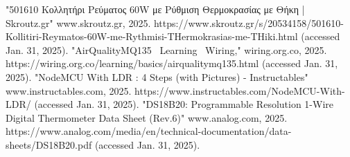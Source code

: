 \documentclass[conference]{IEEEtran}
\begin{document}
\begin{thebibliography}{00}
	 "501610 Κολλητήρι Ρεύματος 60W με Ρύθμιση Θερμοκρασίας με Θήκη | Skroutz.gr" www.skroutz.gr, 2025. https://www.skroutz.gr/s/20534158/501610-Kollitiri-Reymatos-60W-me-Rythmisi-THermokrasias-me-THiki.html (accessed Jan. 31, 2025).
	 "AirQualityMQ135 \ Learning \ Wiring," wiring.org.co, 2025. https://wiring.org.co/learning/basics/airqualitymq135.html (accessed Jan. 31, 2025).
	 "NodeMCU With LDR : 4 Steps (with Pictures) - Instructables" www.instructables.com, 2025. https://www.instructables.com/NodeMCU-With-LDR/ (accessed Jan. 31, 2025).
	 "DS18B20: Programmable Resolution 1-Wire Digital Thermometer Data Sheet (Rev.6)" www.analog.com, 2025. https://www.analog.com/media/en/technical-documentation/data-sheets/DS18B20.pdf (accessed Jan. 31, 2025).
\end{thebibliography}
\end{document}
